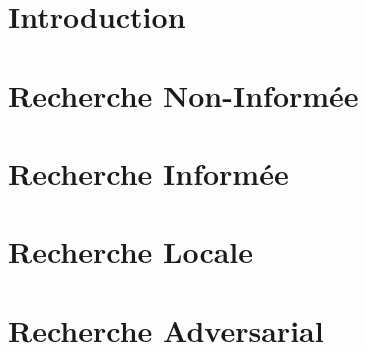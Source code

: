 \documentclass[a4paper, 12pt]{extarticle}
\begin{document}


\makemargins %
\makefrontpage
\maketoc


% 

\section{Introduction} %
\label{sec:introduction}

\newpage



\section{Recherche Non-Informée} %
\label{sec:recherche}

\newpage


\section{Recherche Informée} %
\label{sec:recherche_informee} 

\newpage

\section{Recherche Locale} %
\label{sec:recherche_locale}



\section{Recherche Adversarial} %
\label{sec:recherche_adversarial}

\newpage
\end{document}
